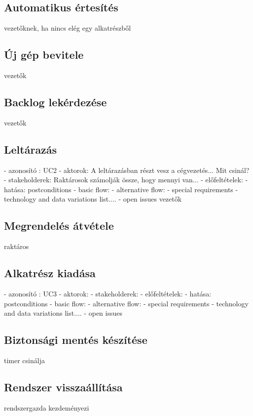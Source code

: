 \documentclass[11pt]{article}\usepackage[left=20mm,right=20mm,top=15mm,bottom=20mm]{geometry}
\begin{document}
\subsection{Automatikus értesítés}
vezetőknek, ha nincs elég egy alkatrészből

\subsection{Új gép bevitele}
vezetők

\subsection{Backlog lekérdezése}
vezetők

\subsection{Leltárazás}
- azonosító : UC2
- aktorok: A leltárazásban részt vesz a cégvezetés... Mit csinál?
- stakeholderek: Raktárosok számolják össze, hogy mennyi van...
- előfeltételek:
- hatása: postconditions
- basic flow:
- alternative flow:
- special requirements
- technology and data variations list.... 
- open issues
vezetők

\subsection{Megrendelés átvétele}
raktáros

\subsection{Alkatrész kiadása}
- azonosító : UC3
- aktorok: 
- stakeholderek:
- előfeltételek:
- hatása: postconditions
- basic flow:
- alternative flow:
- special requirements
- technology and data variations list.... 
- open issues

\subsection{Biztonsági mentés készítése}
timer csinálja

\subsection{Rendszer visszaállítása}
rendszergazda kezdeményezi
\end{document}
